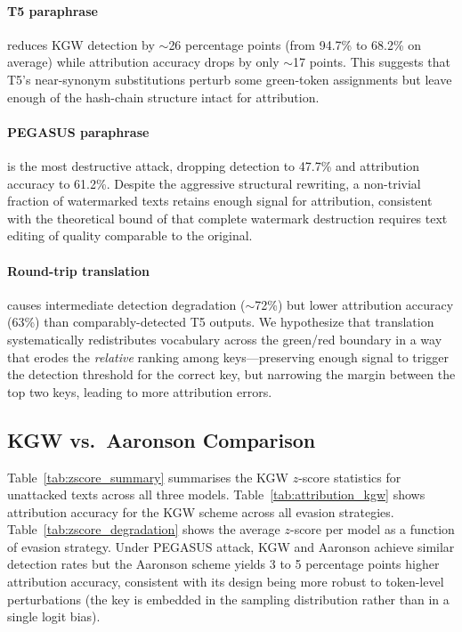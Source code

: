 \documentclass[11pt]{article}
\begin{document}
\paragraph{T5 paraphrase} reduces KGW detection by $\sim$26 percentage points
(from 94.7\% to 68.2\% on average) while attribution accuracy drops by only
$\sim$17 points.
This suggests that T5's near-synonym substitutions perturb some green-token
assignments but leave enough of the hash-chain structure intact for
attribution.

\paragraph{PEGASUS paraphrase} is the most destructive attack, dropping
detection to 47.7\% and attribution accuracy to 61.2\%.
Despite the aggressive structural rewriting, a non-trivial fraction of
watermarked texts retains enough signal for attribution, consistent with
the theoretical bound of \citet{sadasivan2023aigenerated} that
complete watermark destruction requires text editing of quality comparable
to the original.

\paragraph{Round-trip translation} causes intermediate detection degradation
($\sim$72\%) but lower attribution accuracy (63\%) than comparably-detected
T5 outputs.
We hypothesize that translation systematically redistributes vocabulary
across the green/red boundary in a way that erodes the \emph{relative}
ranking among keys---preserving enough signal to trigger the detection
threshold for the correct key, but narrowing the margin between the top two
keys, leading to more attribution errors.

\subsection{KGW vs.\ Aaronson Comparison}

Table~\ref{tab:zscore_summary} summarises the KGW $z$-score statistics for
unattacked texts across all three models.
Table~\ref{tab:attribution_kgw} shows attribution accuracy for the KGW scheme
across all evasion strategies.
Table~\ref{tab:zscore_degradation} shows the average $z$-score per model
as a function of evasion strategy.
Under PEGASUS attack, KGW and Aaronson achieve similar detection rates but the
Aaronson scheme yields 3 to 5 percentage points higher attribution accuracy,
consistent with its design being more robust to token-level perturbations
(the key is embedded in the sampling distribution rather than in a single
logit bias).
\end{document}
